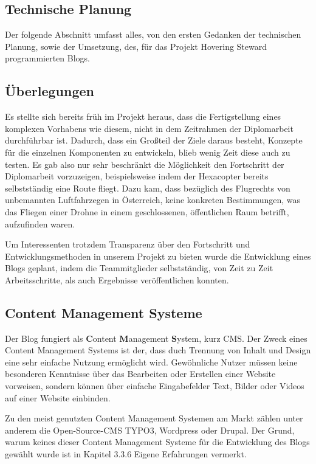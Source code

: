   \subsection{Technische Planung}
  Der folgende Abschnitt umfasst alles, von den ersten Gedanken der technischen Planung, sowie der Umsetzung,
  des, für das Projekt Hovering Steward programmierten Blogs.

    \subsection*{Überlegungen}
    Es stellte sich bereits früh im Projekt heraus, dass die Fertigstellung eines komplexen Vorhabens wie diesem, nicht in
    dem Zeitrahmen der Diplomarbeit durchführbar ist. Dadurch, dass ein Großteil der Ziele daraus besteht, Konzepte für die
    einzelnen Komponenten zu entwickeln, blieb wenig Zeit diese auch zu testen. Es gab also nur sehr beschränkt die Möglichkeit
    den Fortschritt der Diplomarbeit vorzuzeigen, beispielsweise indem der Hexacopter bereits selbstständig eine Route fliegt.
    Dazu kam, dass bezüglich des Flugrechts von unbemannten Luftfahrzegen in Österreich, keine konkreten Bestimmungen, was das Fliegen einer Drohne in einem
    geschlossenen, öffentlichen Raum betrifft, aufzufinden waren.

    Um Interessenten trotzdem Transparenz über den Fortschritt und Entwicklungsmethoden in unserem Projekt zu bieten wurde
    die Entwicklung eines Blogs geplant, indem die Teammitglieder selbstständig, von Zeit zu Zeit Arbeitsschritte, als auch
    Ergebnisse veröffentlichen konnten.

    \subsection*{Content Management Systeme}
    Der Blog fungiert als \textbf{C}ontent \textbf{M}anagement \textbf{S}ystem, kurz CMS. Der Zweck eines
    Content Management Systems ist der, dass duch Trennung von Inhalt und Design eine
    sehr einfache Nutzung ermöglicht wird. Gewöhnliche Nutzer müssen keine besonderen
    Kenntnisse über das Bearbeiten oder Erstellen einer Website vorweisen, sondern
    können über einfache Eingabefelder Text, Bilder oder Videos auf einer Website einbinden.

    Zu den meist genutzten Content Management Systemen am Markt zählen unter anderem die Open-Source-CMS {TYPO3\cite{typo3}},
    {Wordpress\cite{wordpress}} oder {Drupal\cite{drupal}}. Der Grund, warum keines dieser Content Management Systeme für die
    Entwicklung des Blogs gewählt wurde ist in Kapitel 3.3.6 Eigene Erfahrungen vermerkt.

